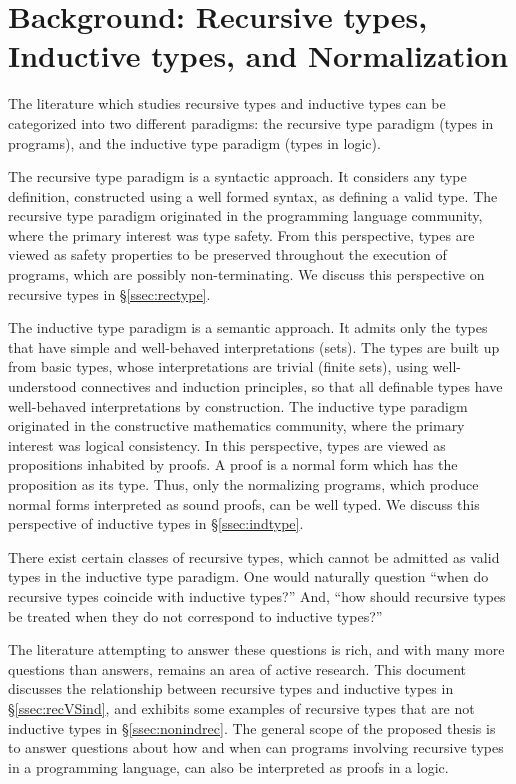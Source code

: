 \section{Background: Recursive types, Inductive types, and Normalization}
\label{sec:bg}
The literature which studies recursive types and inductive types can be
categorized into two different paradigms: the recursive type paradigm
(types in programs), and the inductive type paradigm (types in logic).

The recursive type paradigm is a syntactic approach. It considers any type
definition, constructed using a well formed syntax, as defining a valid type.
The recursive type paradigm originated in the programming language community,
where the primary interest was type safety. From this perspective, types are
viewed as safety properties to be preserved throughout the execution of
programs, which are possibly non-terminating. We discuss this perspective
on recursive types in \S\ref{ssec:rectype}.

The inductive type paradigm is a semantic approach. It admits only the types
that have simple and well-behaved interpretations (\eg sets). The types are
built up from basic types, whose interpretations are trivial (\eg finite sets),
using well-understood connectives and induction principles, so that
all definable types have well-behaved interpretations by construction.
The inductive type paradigm originated in the constructive mathematics community, where the primary interest was logical consistency.
In this perspective, types are viewed as propositions inhabited by proofs.
A proof is a normal form which has the proposition as its type.
Thus, only the normalizing programs, which produce normal forms interpreted
as sound proofs, can be well typed. We discuss this perspective of
inductive types in \S\ref{ssec:indtype}.

There exist certain classes of recursive types, which cannot be admitted as
valid types in the inductive type paradigm. One would naturally question
``when do recursive types coincide with inductive types?'' And, ``how should
recursive types be treated when they do not correspond to inductive types?''

The literature attempting to answer these questions is rich, and with many more
questions than answers, remains an area of active research. This document
discusses the relationship between recursive types and inductive types
in \S\ref{ssec:recVSind}, and exhibits some examples of recursive types
that are not inductive types in \S\ref{ssec:nonindrec}.
The general scope of the proposed thesis is to answer questions about how
and when can programs involving recursive types in a programming language,
can also be interpreted as proofs in a logic.

